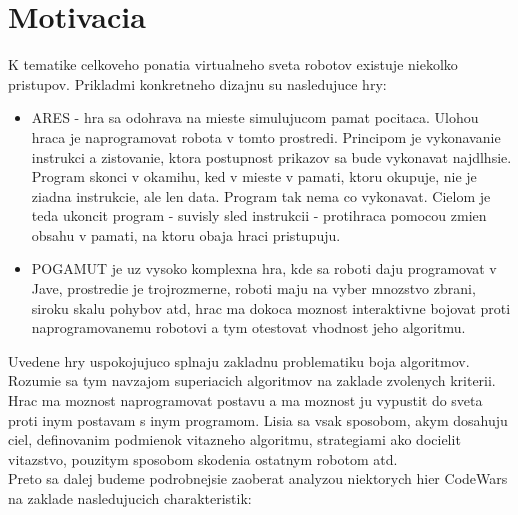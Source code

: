\documentclass[a4paper,11pt,final]{report}
\begin{document}
\section{Motivacia}
K tematike celkoveho ponatia virtualneho sveta robotov existuje niekolko pristupov. Prikladmi konkretneho dizajnu su nasledujuce hry:
\begin{itemize}
\item ARES - hra sa odohrava na mieste simulujucom pamat pocitaca. Ulohou hraca je naprogramovat robota v tomto prostredi. Principom je vykonavanie instrukci a zistovanie, ktora postupnost prikazov sa bude vykonavat najdlhsie. Program skonci v okamihu, ked v mieste v pamati, ktoru okupuje, nie je ziadna instrukcie, ale len data. Program tak nema co vykonavat. Cielom je teda ukoncit program - suvisly sled instrukcii - protihraca pomocou zmien obsahu v pamati, na ktoru obaja hraci pristupuju.
\item POGAMUT je uz vysoko komplexna hra, kde sa roboti daju programovat v Jave, prostredie je trojrozmerne, roboti maju na vyber mnozstvo zbrani, siroku skalu pohybov atd, hrac ma dokoca moznost interaktivne bojovat proti naprogramovanemu robotovi a tym otestovat vhodnost jeho algoritmu.
\end{itemize}
Uvedene hry uspokojujuco splnaju zakladnu problematiku boja algoritmov. Rozumie sa tym navzajom superiacich algoritmov na zaklade zvolenych kriterii.  Hrac ma moznost naprogramovat postavu a  ma moznost ju vypustit do sveta proti inym postavam s inym programom. Lisia sa vsak sposobom, akym dosahuju ciel, definovanim podmienok vitazneho algoritmu, strategiami ako docielit vitazstvo, pouzitym sposobom skodenia ostatnym robotom atd. \\
Preto sa dalej budeme podrobnejsie zaoberat analyzou niektorych hier CodeWars na zaklade nasledujucich charakteristik:
\end{document}
